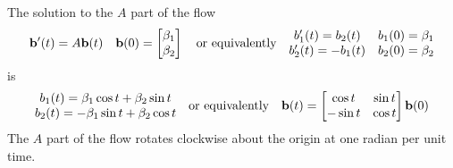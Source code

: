 \begin{eg}[$\ \vv(x,y)= 2y\hi.$]
The solution to  the $A$ part of the flow
\begin{equation*}
\mathbf{b}'(t)=A\mathbf{b}(t)\quad 
    \mathbf{b}(0)=\left[\begin{matrix}\beta_1 \\ \beta_2\end{matrix}\right]
\quad\text{or equivalently}\quad
\begin{matrix}b_1'(t)=b_2(t) & b_1(0)=\beta_1\cr
        b_2'(t)=-b_1(t) & b_2(0)=\beta_2\end{matrix}
\end{equation*}
is
\begin{equation*}
\begin{matrix}b_1(t)=\beta_1\cos t+\beta_2\sin t\cr
        b_2(t)=-\beta_1\sin t+\beta_2\cos t\end{matrix}
\quad\text{or equivalently}\quad
\mathbf{b}(t)=\left[
  \begin{matrix}\cos t& \sin t\cr -\sin t&\cos t\end{matrix}\right]\mathbf{b}(0)
\end{equation*}
The $A$ part of the flow rotates clockwise about  the origin at one radian
per unit time.



\end{eg}
